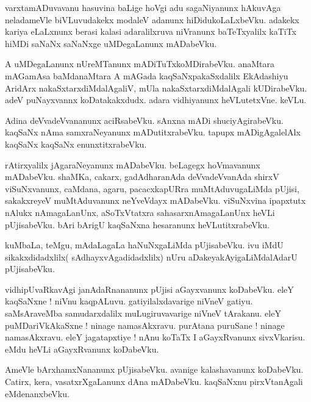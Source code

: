 \documentclass{article}
\begin{document}
\begin{mn}%
varxtamADuvavanu hasuvina baLige hoVgi adu sagaNiyanunx hAkuvAga neladameVle biVLuvudakekx modaleV 
adanunx hiDidukoLaLxbeVku. adakekx kariya eLaLxnunx berasi kalasi adaralilxruva niVranunx 
baTeTxyalilx kaTiTx hiMDi saNaNx saNaNxge uMDegaLanunx mADabeVku.
\end{mn}

\begin{mn}%
A uMDegaLanunx nUreMTanunx mADiTuTxkoMDirabeVku. anaMtara mAGamAsa baMdanaMtara A mAGada 
kaqSaNxpakaSxdalilx EkAdashiyu AridArx nakaSxtarxdiMdalAgaliV, mUla nakaSxtarxdiMdalAgali 
kUDirabeVku. adeV puNayxvannx koDatakakxdudx. adara vidhiyanunx heVLutetxVne. keVLu.
\end{mn}

\begin{mn}%
Adina deVvadeVvananunx aciRsabeVku. sAnxna mADi shuciyAgirabeVku. kaqSaNx nAma samxraNeyanunx 
mADutitxrabeVku. tapupx mADigAgalelAlx kaqSaNx kaqSaNx enunxtitxrabeVku.
\end{mn}

\begin{mn}%
rAtirxyalilx jAgaraNeyanunx  mADabeVku. beLagegx hoVmavanunx mADabeVku. shaMKa, cakarx, 
gadAdharanAda deVvadeVvanAda shirxV viSuNxvanunx, caMdana, agaru, pacacxkapURra muMtAduvugaLiMda 
pUjisi, sakakxreyeV muMtAduvanunx neYveVdayx mADabeVku. viSuNxvina ipapxtutx nAlukx nAmagaLanUnx, 
aSoTxVtatxra sahasarxnAmagaLanUnx heVLi pUjisabeVku. bAri bArigU kaqSaNxna hesaranunx 
heVLutitxrabeVku.
\end{mn}

\begin{mn}%
kuMbaLa, teMgu, mAdaLagaLa haNuNxgaLiMda pUjisabeVku. ivu iMdU sikakxdidadxlilx( 
sAdhayxvAgadidadxlilx) nUru aDakeyakAyigaLiMdalAdarU pUjisabeVku.
\end{mn}

\begin{mn}%
vidhipUvaRkavAgi janAdaRnananunx pUjisi aGayxvanunx koDabeVku. eleY kaqSaNxne ! niVnu kaqpALuvu. 
gatiyilalxdavarige niVneV gatiyu. saMsAraveMba samudarxdalilx muLugiruvavarige niVneV tArakanu. 
eleY puMDariVkAkaSxne ! ninage namasAkxravu. purAtana puruSane ! ninage namasAkxravu. eleY 
jagatapxtiye ! nAnu koTaTx I aGayxRvanunx sivxVkarisu. eMdu heVLi aGayxRvanunx koDabeVku.
\end{mn}

\begin{mn}%
AmeVle bArxhamxNananunx pUjisabeVku. avanige kalashavanunx koDabeVku. Catirx, kera, 
vasatxrXgaLanunx dAna mADabeVku. kaqSaNxnu pirxVtanAgali eMdenanxbeVku.
\end{mn}
\end{document}
